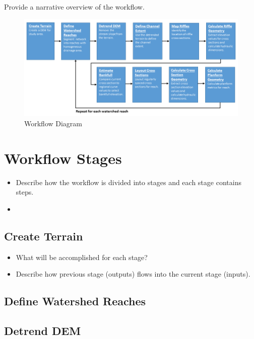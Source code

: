 \documentclass[]{book}
\providecommand{\tightlist}{%
  \setlength{\itemsep}{0pt}\setlength{\parskip}{0pt}}
\theoremstyle{definition}
\theoremstyle{definition}
\theoremstyle{definition}
\theoremstyle{remark}
\begin{document}
Provide a narrative overview of the workflow.

\begin{figure}
\includegraphics[width=1\linewidth]{images/Workflow_watershed} \caption{Workflow Diagram}\label{fig:unnamed-chunk-3}
\end{figure}

\section{Workflow Stages}\label{workflow-stages}

\begin{itemize}
\item
  Describe how the workflow is divided into stages and each stage
  contains steps.
\item
\end{itemize}

\subsection{Create Terrain}\label{create-terrain}

\begin{itemize}
\tightlist
\item
  What will be accomplished for each stage?
\item
  Describe how previous stage (outputs) flows into the current stage
  (inputs).
\end{itemize}

\subsection{Define Watershed Reaches}\label{define-watershed-reaches}

\subsection{Detrend DEM}\label{detrend-dem}
\end{document}
